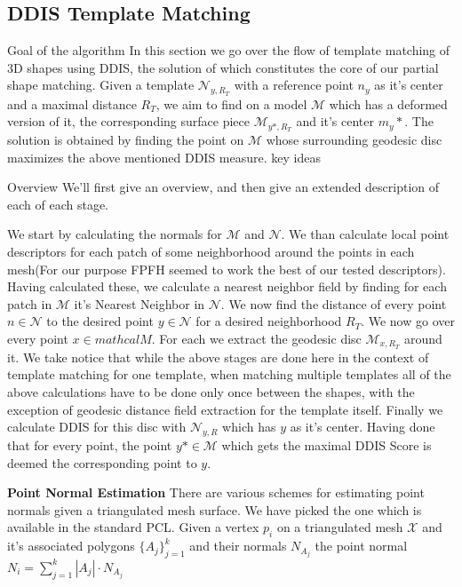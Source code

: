 \documentclass[10pt,twocolumn,letterpaper]{article}
\begin{document}
\subsection{DDIS Template Matching}
{\color{red} Goal of the algorithm}
In this section we go over the flow of template matching of 3D shapes using DDIS, the solution of which constitutes the core of our partial shape matching. Given a template $\mathcal{N}_{y,R_T}$ with a reference point $n_y$ as it's center and a maximal distance $R_T$, we aim to find on a model $\mathcal{M}$ which has a deformed version of it, the corresponding surface piece $\mathcal{M}_{y*,R_T}$ and it's center $m_y*$. The solution is obtained by finding the point on $\mathcal{M}$ whose surrounding geodesic disc maximizes the above mentioned DDIS measure.
{\color{red}key ideas}

{\color{red} Overview}
We'll first give an overview, and then give an extended description of each of each stage. 

We start by calculating the normals for $\mathcal{M}$ and $\mathcal{N}$.
We than calculate local point descriptors for each patch of some neighborhood around the points in each mesh(For our purpose FPFH seemed to work the best of our tested descriptors). 
Having calculated these, we calculate a nearest neighbor field by finding for each patch in $\mathcal{M}$ it's Nearest Neighbor in $\mathcal{N}$. 
We now find the distance of every point $n\in \mathcal{N}$ to the desired point $y\in \mathcal{N}$ for a desired neighborhood $R_T$.
We now go over every point $x\in mathcal{M}$. For each we extract the geodesic disc $\mathcal{M}_{x,R_T}$ around it.
We take notice that while the above stages are done here in the context of template matching for one template, when matching multiple templates all of the above calculations have to be done only once between the shapes, with the exception of geodesic distance field extraction for the template itself. 
Finally we calculate DDIS for this disc with $\mathcal{N}_{y,R}$ which has $y$ as it's center. Having done that for every point, the point $y*\in \mathcal{M}$  which gets the maximal DDIS Score is deemed the corresponding point to $y$.


\textbf{Point Normal Estimation}
There are various schemes for estimating point normals given a triangulated mesh surface. We have picked the one which is available in the standard PCL. Given a vertex $p_i$ on a triangulated mesh $\mathcal{X}$ and it's associated polygons $\{A_j\}_{j=1}^k$ and their normals $N_{A_j}$ the point normal $N_i = \sum_{j=1}^k{|A_j|\cdot N_{A_j}}$
\end{document}
